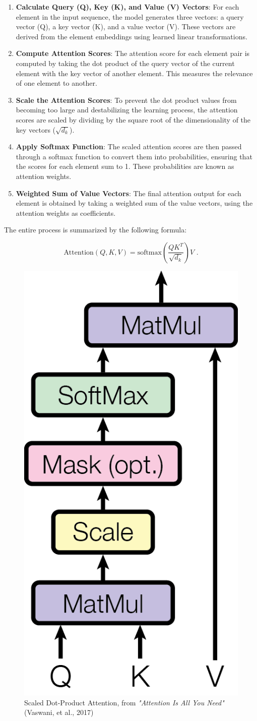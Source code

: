 \begin{enumerate}
    \item \textbf{Calculate Query (Q), Key (K), and Value (V) Vectors}: For each element in the input sequence, the model generates three vectors: a query vector (Q), a key vector (K), and a value vector (V). These vectors are derived from the element embeddings using learned linear transformations.
    \item \textbf{Compute Attention Scores}: The attention score for each element pair is computed by taking the dot product of the query vector of the current element with the key vector of another element. This measures the relevance of one element to another.
    \item \textbf{Scale the Attention Scores}: To prevent the dot product values from becoming too large and destabilizing the learning process, the attention scores are scaled by dividing by the square root of the dimensionality of the key vectors ($\sqrt{d_k}$).
    \item \textbf{Apply Softmax Function}: The scaled attention scores are then passed through a softmax function to convert them into probabilities, ensuring that the scores for each element sum to 1. These probabilities are known as attention weights.
    \item \textbf{Weighted Sum of Value Vectors}: The final attention output for each element is obtained by taking a weighted sum of the value vectors, using the attention weights as coefficients.
\end{enumerate}

The entire process is summarized by the following formula:

\begin{equation}
\text{Attention}(Q, K, V) = \text{softmax}\left(\frac{QK^T}{\sqrt{d_k}}\right)V \text{ .}
\end{equation}

\begin{figure}[htbp]
    \centering
    \includegraphics[width=3 cm]{3_ChapterTranformerVariants/figuras/ScaledDotProductAttention.png}
    \caption{Scaled Dot-Product Attention, from \textit{"Attention Is All You Need"} (Vaswani, et al., 2017) \cite{vaswani2023attention}}
    \end{figure}

